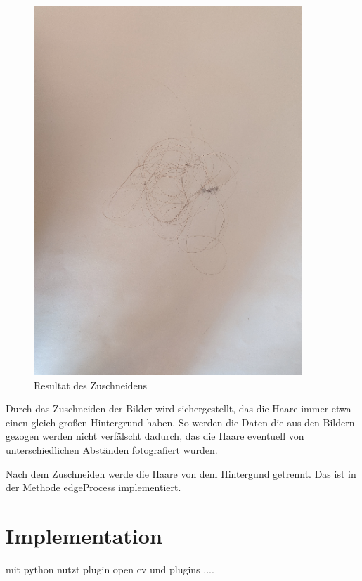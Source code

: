 \documentclass[german,a4paper,12pt]{llncs}
\begin{document}
\begin{figure}
	\centering
	\includegraphics[width=0.9\textwidth]{fig64/03crop image.png}
	\caption[]{Resultat des Zuschneidens}
	\label{img:Crop}
\end{figure}

Durch das Zuschneiden der Bilder wird sichergestellt, das die Haare immer etwa einen gleich großen Hintergrund haben. So werden die Daten die aus den Bildern gezogen werden nicht verfälscht dadurch, das die Haare eventuell von unterschiedlichen Abständen fotografiert wurden. 

Nach dem Zuschneiden werde die Haare von dem Hintergund getrennt.
Das ist in der Methode edgeProcess implementiert.




\section{Implementation}

mit python
nutzt plugin open cv und plugins ....
\end{document}
